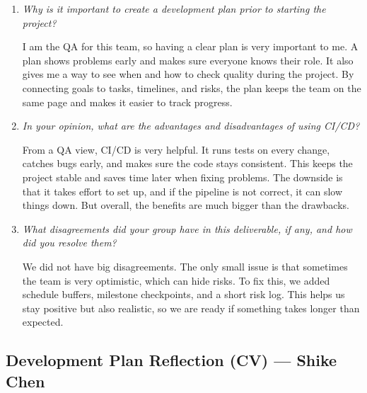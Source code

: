 \documentclass{article}
\begin{document}
\begin{enumerate}
  \item \textit{Why is it important to create a development plan prior to starting the project?}

        I am the QA for this team, so having a clear plan is very important to me. A
        plan shows problems early and makes sure everyone knows their role. It also
        gives me a way to see when and how to check quality during the project. By
        connecting goals to tasks, timelines, and risks, the plan keeps the team on the
        same page and makes it easier to track progress.

  \item \textit{In your opinion, what are the advantages and disadvantages of using CI/CD?}

        From a QA view, CI/CD is very helpful. It runs tests on every change, catches
        bugs early, and makes sure the code stays consistent. This keeps the project
        stable and saves time later when fixing problems. The downside is that it takes
        effort to set up, and if the pipeline is not correct, it can slow things down.
        But overall, the benefits are much bigger than the drawbacks.

  \item \textit{What disagreements did your group have in this deliverable, if any, and how did you resolve them?}

        We did not have big disagreements. The only small issue is that sometimes the
        team is very optimistic, which can hide risks. To fix this, we added schedule
        buffers, milestone checkpoints, and a short risk log. This helps us stay
        positive but also realistic, so we are ready if something takes longer than
        expected.
\end{enumerate}

\subsection*{Development Plan Reflection (CV) --- Shike Chen}
\end{document}
